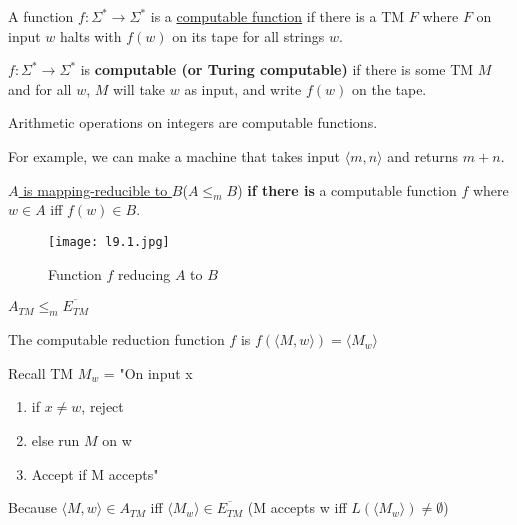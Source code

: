 \begin{definition}
    A function \(f: \Sigma^* \rightarrow \Sigma^*\) is a \underline{computable function} if there is a TM \(F\) where \(F\) on input \(w\) halts with \(f(w)\) on its tape for all strings \(w\).     
    \begin{note}[rephrase]
        \(f: \Sigma^* \rightarrow \Sigma^*\)  is \textbf{ computable (or Turing computable)} if there is some TM \(M\) and for all \(w\), \(M\) will take \(w\) as input, and write \(f(w)\) on the tape.      
    \end{note}
\end{definition}

\begin{example}
    Arithmetic operations on integers are computable functions.

    For example, we can make a machine that takes input \(\langle m, n \rangle\) and returns \(m + n\). 
\end{example}

\begin{definition}
    \underline{\(A\) is mapping-reducible to \(B\)}(\(A \leq_m B\)) \textbf{if there is} a computable function \(f\) where \(w \in A\) iff \(f(w) \in B\).   

    \begin{figure}[H]
        \centering
        \texttt{[image: l9.1.jpg]}
        \caption{Function \(f\) reducing \(A\) to \(B\)}
    \end{figure}
\end{definition}

\begin{example}\label{example: 9.1}
    \(A_{TM} \leq_m \overline{E_{TM}}\)     

    The computable reduction function \(f\) is \(f(\langle M, w \rangle) = \langle M_w \rangle\) 

    \begin{remark}
        Recall TM \(M_w\)  = "On input x
        \begin{enumerate}
            \item if \(x \neq w\), reject
            \item else run \(M\) on w
            \item Accept if M accepts"  
        \end{enumerate}
    \end{remark}

    Because \(\langle M, w\rangle \in A_{TM} \) iff \(\langle M_w \rangle \in \overline{E_{TM}}\) (M accepts w iff \(L(\langle M_w \rangle) \neq \emptyset\))  
\end{example}


